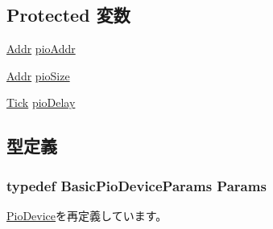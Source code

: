 \subsection*{Protected 変数}
\begin{DoxyCompactItemize}
\item 
\hyperlink{base_2types_8hh_af1bb03d6a4ee096394a6749f0a169232}{Addr} \hyperlink{classBasicPioDevice_afa7a5450c2bc6f73bc056050c9177193}{pioAddr}
\item 
\hyperlink{base_2types_8hh_af1bb03d6a4ee096394a6749f0a169232}{Addr} \hyperlink{classBasicPioDevice_a390529fe683187c290621e1822e0d5d1}{pioSize}
\item 
\hyperlink{base_2types_8hh_a5c8ed81b7d238c9083e1037ba6d61643}{Tick} \hyperlink{classBasicPioDevice_ac8e969635a78ab9ab123904ccca434cc}{pioDelay}
\end{DoxyCompactItemize}


\subsection{型定義}
\hypertarget{classBasicPioDevice_a2845515ac6467f10540747053c8a0449}{
\subsubsection[{Params}]{\setlength{\rightskip}{0pt plus 5cm}typedef BasicPioDeviceParams {\bf Params}}}
\label{classBasicPioDevice_a2845515ac6467f10540747053c8a0449}


\hyperlink{classPioDevice_a9cdbda5b5cc24147ce82b7d07bf03cd1}{PioDevice}を再定義しています。

